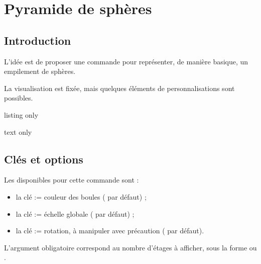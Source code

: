 \begin{PresCodeTexPL}{}
\end{PresCodeTexPL}

\pagebreak

\section{Pyramide de sphères}\label{pyramballes}

\subsection{Introduction}

\begin{tipblock}
 L'idée est de proposer une commande pour représenter, de manière basique, un empilement de sphères.

\smallskip

La visualisation est fixée, mais quelques éléments de personnalisations sont possibles.
\end{tipblock}

\begin{PresCodeTexPL}{listing only}
\end{PresCodeTexPL}

\begin{PresCodeTexPL}{text only}
\end{PresCodeTexPL}

\subsection{Clés et options}

\begin{cautionblock}
Les  disponibles pour cette commande sont :

\begin{itemize}
	\item la clé  := couleur des boules ( par défaut) ;
	\item la clé  := échelle globale ( par défaut) ;
	\item la clé  := rotation, à manipuler avec précaution ( par défaut).
\end{itemize}

L'argument obligatoire correspond au nombre d'étages à afficher, sous la forme  ou .
\end{cautionblock}

